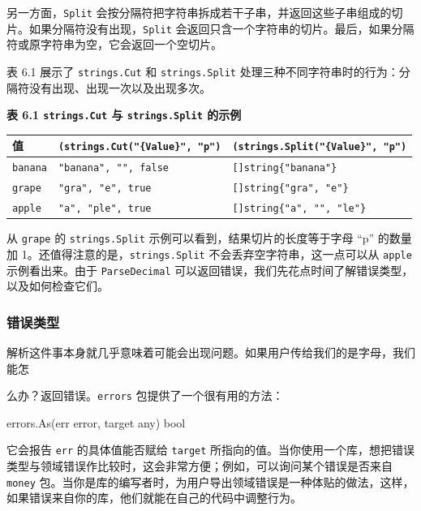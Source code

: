 另一方面，\texttt{Split} 会按分隔符把字符串拆成若干子串，并返回这些子串组成的切片。如果分隔符没有出现，\texttt{Split} 会返回只含一个字符串的切片。最后，如果分隔符或原字符串为空，它会返回一个空切片。

表 6.1 展示了 \texttt{strings.Cut} 和 \texttt{strings.Split} 处理三种不同字符串时的行为：分隔符没有出现、出现一次以及出现多次。

\medskip
\noindent\textbf{表 6.1 \texttt{strings.Cut} 与 \texttt{strings.Split} 的示例}

\begin{center}
\small
\begin{tabularx}{\textwidth}{|l|X|X|}
\hline
值 & \texttt{(strings.Cut("\{Value\}", "p")} & \texttt{(strings.Split("\{Value\}", "p")} \\
\hline
\texttt{banana} & \texttt{"banana", "", false} & \texttt{[]string\{"banana"\}} \\
\hline
\texttt{grape} & \texttt{"gra", "e", true} & \texttt{[]string\{"gra", "e"\}} \\
\hline
\texttt{apple} & \texttt{"a", "ple", true} & \texttt{[]string\{"a", "", "le"\}} \\
\hline
\end{tabularx}
\end{center}

从 \texttt{grape} 的 \texttt{strings.Split} 示例可以看到，结果切片的长度等于字母 ``p'' 的数量加 1。还值得注意的是，\texttt{strings.Split} 不会丢弃空字符串，这一点可以从 \texttt{apple} 示例看出来。由于 \texttt{ParseDecimal} 可以返回错误，我们先花点时间了解错误类型，以及如何检查它们。

\subsubsection*{错误类型}

解析这件事本身就几乎意味着可能会出现问题。如果用户传给我们的是字母，我们能怎

么办？返回错误。\texttt{errors} 包提供了一个很有用的方法：

\begin{gocode}[]
errors.As(err error, target any) bool
\end{gocode}

它会报告 \texttt{err} 的具体值能否赋给 \texttt{target} 所指向的值。当你使用一个库，想把错误类型与领域错误作比较时，这会非常方便；例如，可以询问某个错误是否来自 \texttt{money} 包。当你是库的编写者时，为用户导出领域错误是一种体贴的做法，这样，如果错误来自你的库，他们就能在自己的代码中调整行为。

